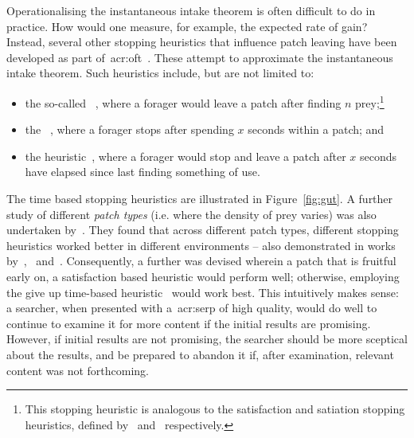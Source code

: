 Operationalising the instantaneous intake theorem is often difficult to do in practice. How would one measure, for example, the expected rate of gain? Instead, several other stopping heuristics that influence patch leaving have been developed as part of~\gls{acr:oft}~\citep{stephens1986foraging_theory}. These attempt to approximate the instantaneous intake theorem. Such heuristics include, but are not limited to:

\begin{itemize}
    \item{the so-called ~\citep{gibb1958number_rule}, where a forager would leave a patch after finding $n$ prey;\footnote{This stopping heuristic is analogous to the satisfaction and satiation stopping heuristics, defined by~\cite{cooper1973retrieval_effectiveness} and~\cite{simon1955satiation} respectively.}}
    
    \item{the ~\citep{charles1972behaviour, krebs1973time_rule}, where a forager stops after spending $x$ seconds within a patch; and}
    
    \item{the  heuristic~\citep{krebs1974leave_after_rule}, where a forager would stop and leave a patch after $x$ seconds have elapsed since last finding something of use.}
\end{itemize}

The time based stopping heuristics are illustrated in Figure~\ref{fig:gut}. A further study of different \emph{patch types} (i.e. where the density of prey varies) was also undertaken by~\cite{mcnair1982gut_mvt}. They found that across different patch types, different stopping heuristics worked better in different environments -- also demonstrated in works by~\cite{iwasa1981prey_distribution},~\cite{mcnair1982gut_mvt} and~\cite{green1984oft_stopping}. Consequently, a further  was devised wherein a patch that is fruitful early on, a satisfaction based heuristic would perform well; otherwise, employing the give up time-based heuristic~\citep{krebs1974leave_after_rule} would work best. This intuitively makes sense: a searcher, when presented with a~\gls{acr:serp} of high quality, would do well to continue to examine it for more content if the initial results are promising. However, if initial results are not promising, the searcher should be more sceptical about the results, and be prepared to abandon it if, after examination, relevant content was not forthcoming.

